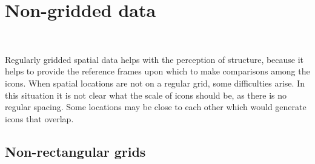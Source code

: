 \documentclass[oneside]{article}
\begin{document}
% 
% 
% 
% 

\section{Non-gridded data}~\label{sec:irregular}

Regularly gridded spatial data helps with the perception of structure, because it helps to provide the reference frames upon which to make comparisons among the icons. When spatial locations are not on a regular grid, some difficulties arise. In this situation it is not clear what the scale of icons should be, as there is no regular spacing. Some locations may be close to each other which would generate icons that overlap. 

\subsection{Non-rectangular grids}
\end{document}
